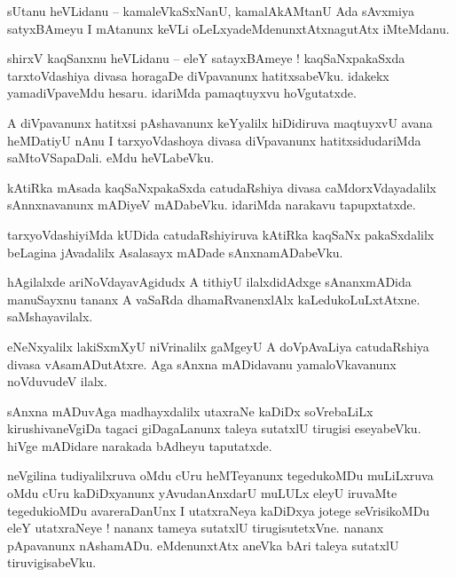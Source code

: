 \documentclass{article}
\begin{document}
\begin{mn}%
sUtanu heVLidanu -- kamaleVkaSxNanU, kamalAkAMtanU Ada sAvxmiya satyxBAmeyu I mAtanunx keVLi 
oLeLxyadeMdenunxtAtxnagutAtx iMteMdanu.
\end{mn}

\begin{mn}%
shirxV kaqSanxnu heVLidanu -- eleY satayxBAmeye ! kaqSaNxpakaSxda tarxtoVdashiya divasa horagaDe 
diVpavanunx hatitxsabeVku. idakekx yamadiVpaveMdu hesaru. idariMda pamaqtuyxvu hoVgutatxde.
\end{mn}

\begin{mn}%
A diVpavanunx hatitxsi pAshavanunx keYyalilx hiDidiruva maqtuyxvU avana heMDatiyU nAnu I 
tarxyoVdashoya divasa diVpavanunx hatitxsidudariMda saMtoVSapaDali. eMdu heVLabeVku.
\end{mn}

\begin{mn}%
kAtiRka mAsada kaqSaNxpakaSxda catudaRshiya divasa caMdorxVdayadalilx sAnnxnavanunx mADiyeV 
mADabeVku. idariMda narakavu tapupxtatxde.
\end{mn}

\begin{mn}%
tarxyoVdashiyiMda kUDida catudaRshiyiruva kAtiRka kaqSaNx pakaSxdalilx beLagina jAvadalilx 
Asalasayx mADade sAnxnamADabeVku.
\end{mn}

\begin{mn}%
hAgilalxde ariNoVdayavAgidudx A tithiyU ilalxdidAdxge sAnanxmADida manuSayxnu tananx A vaSaRda 
dhamaRvanenxlAlx kaLedukoLuLxtAtxne. saMshayavilalx.
\end{mn}

\begin{mn}%
eNeNxyalilx lakiSxmXyU niVrinalilx gaMgeyU A doVpAvaLiya catudaRshiya divasa vAsamADutAtxre. Aga 
sAnxna mADidavanu yamaloVkavanunx noVduvudeV ilalx.
\end{mn}

\begin{mn}%
sAnxna mADuvAga madhayxdalilx utaxraNe kaDiDx soVrebaLiLx kirushivaneVgiDa tagaci giDagaLanunx 
taleya sutatxlU tirugisi eseyabeVku. hiVge mADidare narakada bAdheyu taputatxde.
\end{mn}

\begin{mn}%
neVgilina tudiyalilxruva oMdu cUru heMTeyanunx tegedukoMDu muLiLxruva oMdu cUru kaDiDxyanunx 
yAvudanAnxdarU muLULx eleyU iruvaMte tegedukioMDu avareraDanUnx I utatxraNeya kaDiDxya jotege 
seVrisikoMDu eleY utatxraNeye ! nananx tameya sutatxlU tirugisutetxVne. nananx pApavanunx 
nAshamADu. eMdenunxtAtx aneVka bAri taleya sutatxlU tiruvigisabeVku.
\end{mn}
\end{document}
